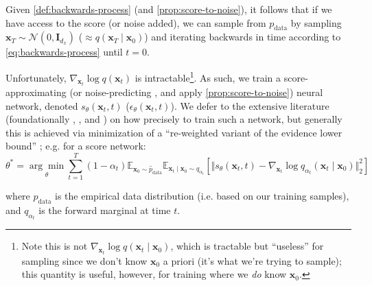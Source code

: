 Given \autoref{def:backwards-process} (and \autoref{prop:score-to-noise}), it follows that if we have
access to the score (or noise added), we can sample from $p_{\text{data}}$ by sampling
$\mathbf{x}_T \sim \mathcal{N}(0, \mathbf{I}_{d_x})$ ($\approx q(\mathbf{x}_T \mid \mathbf{x}_0)$)
and iterating backwards in time according to \autoref{eq:backwards-process} until $t=0$.

Unfortunately, $\nabla_{\mathbf{x}_t}\log q(\mathbf{x}_t)$ is intractable\footnote{Note this is not
$\nabla_{\mathbf{x}_t}\log q(\mathbf{x}_t \mid \mathbf{x}_0)$, which is tractable but ``useless''
for sampling since we don't know $\mathbf{x}_0$ a priori (it's what we're trying to sample); this
quantity is useful, however, for training where we \emph{do} know $\mathbf{x}_0$.}.
As such, we train a score-approximating \parencite{songScoreBasedGenerativeModeling2021} (or
noise-predicting \parencite{hoDenoisingDiffusionProbabilistic2020}, and apply
\autoref{prop:score-to-noise}) neural network, denoted $s_\theta(\mathbf{x}_t, t)$
($\epsilon_\theta(\mathbf{x}_t, t)$). We defer to the extensive literature (foundationally
\textcite{hoDenoisingDiffusionProbabilistic2020}, \textcite{songGenerativeModelingEstimating2020},
\textcite{songScoreBasedGenerativeModeling2021} and \textcite{nicholImprovedDenoisingDiffusion2021})
on how precisely to train such a network, but generally this is achieved via minimization of a
``re-weighted variant of the evidence lower bound''
\parencite{songScoreBasedGenerativeModeling2021}; e.g. for a score network:
\begin{equation*}
    \theta^* = \underset{\theta}{\arg\min}\sum_{t=1}^T (1 - \alpha_t)\mathbb{E}_{\mathbf{x}_0 \sim \hat{p}_{\text{data}}}\mathbb{E}_{\mathbf{x}_t \mid \mathbf{x}_0 \sim q_{\alpha_t}}\left[\Vert s_\theta(\mathbf{x}_t, t) - \nabla_{\mathbf{x}_t}\log q_{\alpha_t}(\mathbf{x}_t \mid \mathbf{x}_0)\Vert_2^2\right]
\end{equation*}

where $\hat{p}_{\text{data}}$ is the empirical data distribution (i.e. based on our training
samples), and $q_{\alpha_t}$ is the forward marginal at time $t$.

